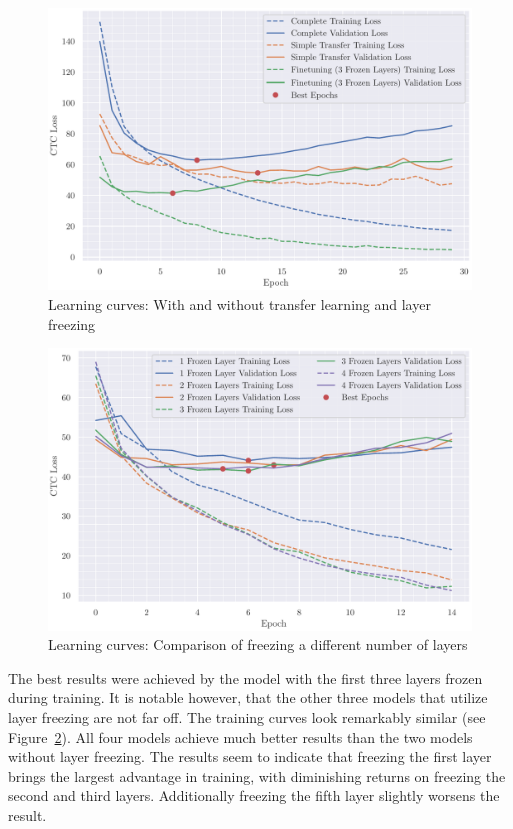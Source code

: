 \documentclass[12pt]{article}    %
\begin{document}
\begin{figure}[ht]
    \centering
    \includegraphics[width=\textwidth]{../3curves.pdf}
    \caption{Learning curves: With and without transfer learning and layer freezing}
    \label{fig:3c}
\end{figure}

\begin{figure}[ht]
    \centering
    \includegraphics[width=\textwidth]{../4curves.pdf}
    \caption{Learning curves: Comparison of freezing a different number of layers}
    \label{fig:4c}
\end{figure}

The best results were achieved by the model with the first three layers frozen during training. It is notable however, that the other three models that utilize layer freezing are not far off. The training curves look remarkably similar (see Figure~\ref{fig:4c}). All four models achieve much better results than the two models without layer freezing. The results seem to indicate that freezing the first layer brings the largest advantage in training, with diminishing returns on freezing the second and third layers. Additionally freezing the fifth layer slightly worsens the result.
\end{document}
